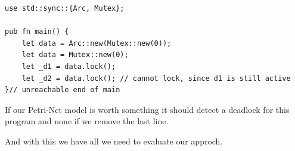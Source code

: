 \begin{lstlisting}
use std::sync::{Arc, Mutex};

pub fn main() {
    let data = Arc::new(Mutex::new(0));
    let data = Mutex::new(0);
    let _d1 = data.lock();
    let _d2 = data.lock(); // cannot lock, since d1 is still active
}// unreachable end of main
\end{lstlisting}
If our Petri-Net model is worth something it should detect a deadlock for this program and none if we remove the last line.

And with this we have all we need to evaluate our approch.

